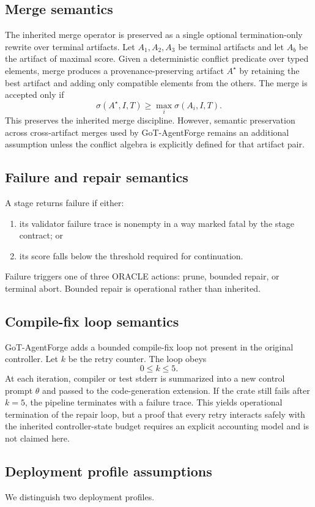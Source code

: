 \documentclass[11pt,a4paper,oneside]{article}
\begin{document}
\subsection{Merge semantics}
The inherited merge operator is preserved as a single optional termination-only rewrite over terminal artifacts. Let $A_1,A_2,A_3$ be terminal artifacts and let $A_b$ be the artifact of maximal score. Given a deterministic conflict predicate over typed elements, merge produces a provenance-preserving artifact $A^\star$ by retaining the best artifact and adding only compatible elements from the others. The merge is accepted only if
\[
\sigma(A^\star,I,T) \ge \max_i \sigma(A_i,I,T).
\]
This preserves the inherited merge discipline. However, semantic preservation across cross-artifact merges used by GoT-AgentForge remains an additional assumption unless the conflict algebra is explicitly defined for that artifact pair.

\subsection{Failure and repair semantics}
A stage returns failure if either:
\begin{enumerate}[leftmargin=2em]
    \item its validator failure trace is nonempty in a way marked fatal by the stage contract; or
    \item its score falls below the threshold required for continuation.
\end{enumerate}
Failure triggers one of three ORACLE actions: prune, bounded repair, or terminal abort. Bounded repair is operational rather than inherited.

\subsection{Compile-fix loop semantics}
GoT-AgentForge adds a bounded compile-fix loop not present in the original controller. Let $k$ be the retry counter. The loop obeys
\[
0 \le k \le 5.
\]
At each iteration, compiler or test stderr is summarized into a new control prompt $\theta$ and passed to the code-generation extension. If the crate still fails after $k=5$, the pipeline terminates with a failure trace. This yields operational termination of the repair loop, but a proof that every retry interacts safely with the inherited controller-state budget requires an explicit accounting model and is not claimed here.

\subsection{Deployment profile assumptions}
We distinguish two deployment profiles.
\end{document}
